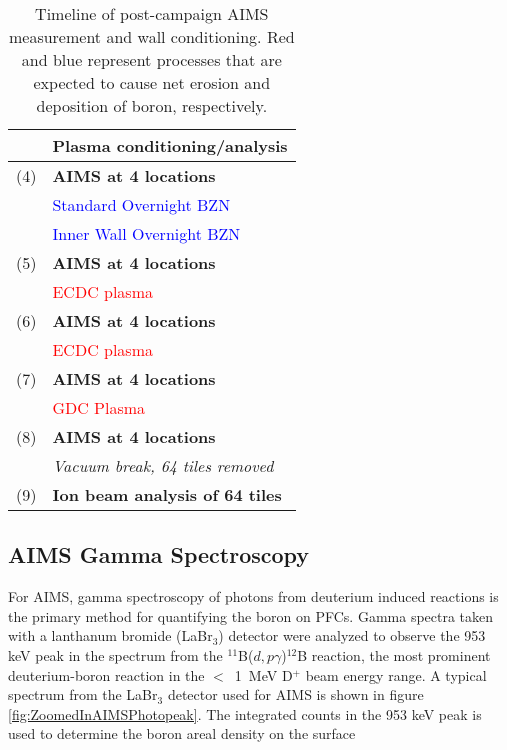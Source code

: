 \documentclass[final,3p,times,twocolumn]{elsarticle}
\begin{document}
\begin{table}
 \centering
 \begin{tabular}{ll}\hline
  &Plasma conditioning/analysis \\ \hline \hline
  (4)&\textbf{AIMS at 4 locations} \\
  &\textcolor{blue}{Standard Overnight BZN}  \\
  &\textcolor{blue}{Inner Wall Overnight BZN}  \\
  (5)&\textbf{AIMS at 4 locations}  \\
  &\textcolor{red}{ECDC plasma}  \\
  (6)&\textbf{AIMS at 4 locations} \\
  &\textcolor{red}{ECDC plasma}  \\
  (7)&\textbf{AIMS at 4 locations} \\
  &\textcolor{red}{GDC Plasma}  \\
  (8)&\textbf{AIMS at 4 locations} \\
  &\textit{Vacuum break, 64 tiles removed} \\
  (9)&\textbf{Ion beam analysis of 64 tiles} \\ \hline
 \end{tabular}
 \caption{Timeline of post-campaign AIMS measurement and wall conditioning. Red and blue represent processes that are expected to cause net erosion and deposition of boron, respectively.}
 \label{tab:PostCampaignTimeline}
\end{table}


\subsection{AIMS Gamma Spectroscopy}

For AIMS, gamma spectroscopy of photons from deuterium induced reactions is the primary method for quantifying the boron on PFCs. Gamma spectra taken with a lanthanum bromide (LaBr$_3$) detector were analyzed to observe the 953 keV peak in the spectrum from the $^{11}$B($d,p\gamma$)$^{12}$B reaction, the most prominent deuterium-boron reaction in the $<$~1~MeV D$^+$ beam energy range. A typical spectrum from the LaBr$_3$ detector used for AIMS is shown in figure \ref{fig:ZoomedInAIMSPhotopeak}. The integrated counts in the 953 keV peak is used to determine the boron areal density on the surface
\end{document}
